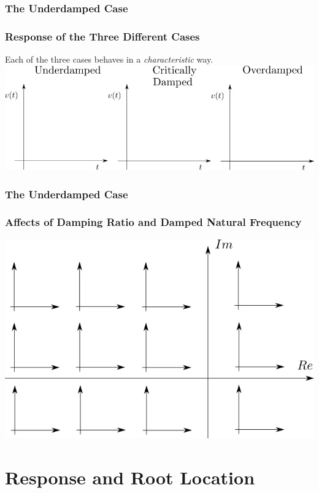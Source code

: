 \documentclass[fleqn]{beamer} %
\newcommand{\sectionIIItitle}{Response and Root Location}
\newcommand{\sectionIIsubsectionIVtitle}{The Underdamped Case}
\begin{document}
			\begin{frame}
				\frametitle{\sectionIIsubsectionIVtitle}
				\bigskip

				\frametitle{Response of the Three Different Cases}

				\large Each of the three cases behaves in a {\it characteristic} way.\vspcc
				\includegraphics[scale=0.5]{images/lecture2_fig3.png} 

				\btVFill 
			\end{frame}		
				

			\begin{frame}
				\frametitle{\sectionIIsubsectionIVtitle}
				\bigskip

				\frametitle{Affects of Damping Ratio and Damped Natural Frequency}

				\includegraphics[scale=0.60]{images/lecture2_fig4.png} 

				\btVFill 
			\end{frame}	
		
	\section{\sectionIIItitle}\label{sectionIII}
\end{document}
